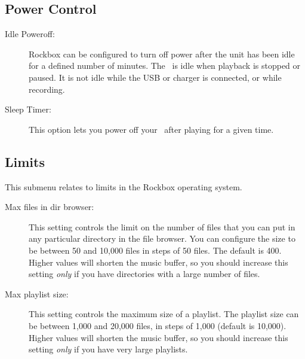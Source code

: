 \subsection{Power Control}
  \begin{description}
    \item [\label{ref:idlepoweroff}Idle Poweroff: ]Rockbox can be configured
    to turn off power after the unit has been idle for a defined number of
    minutes. The \dap\ is idle when playback is stopped or paused. It is not
    idle while the USB or charger is connected, or while recording.

    \item [Sleep Timer: ]This option lets you power off your \dap\ after
    playing for a given time.
  \end{description}

\subsection{Limits}
This submenu relates to limits in the Rockbox operating system.
  \begin{description}
    \item [Max files in dir browser: ]This setting controls the limit on
    the number of files that you can put in any particular directory in the
    file browser. You can configure the size to be between 50 and 10,000 files
    in steps of 50 files. The default is 400. Higher values will shorten the
    music buffer, so you should increase this setting \emph{only} if you have
    directories with a large number of files.

    \item [Max playlist size: ]This setting controls the maximum size of 
    a playlist. The playlist size can be between 1,000 and 20,000 files,
    in steps of 1,000 (default is 10,000). Higher values will shorten the
    music buffer, so you should increase this setting \emph{only} if you
    have very large playlists.
  \end{description}

